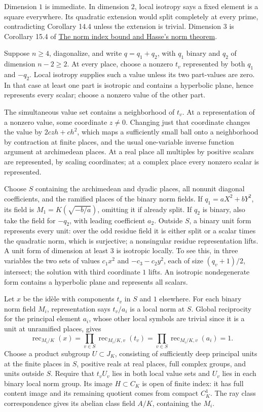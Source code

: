 \documentclass[11pt,a4paper]{article}
\begin{document}
Dimension \(1\) is immediate. In dimension \(2\), local isotropy says a
fixed element is a square everywhere. Its quadratic extension would
split completely at every prime, contradicting Corollary 14.4 unless the
extension is trivial. Dimension \(3\) is Corollary 15.4 of
\href{../the-norm-index-bound-and-hasses-norm-theorem.html}{The norm
index bound and Hasse's norm theorem}.

Suppose \(n\geq4\), diagonalize, and write \(q=q_1+q_2\), with \(q_1\)
binary and \(q_2\) of dimension \(n-2\geq2\). At every place, choose a
nonzero \(t_v\) represented by both \(q_1\) and \(-q_2\). Local isotropy
supplies such a value unless its two part-values are zero. In that case
at least one part is isotropic and contains a hyperbolic plane, hence
represents every scalar; choose a nonzero value of the other part.

The simultaneous value set contains a neighborhood of \(t_v\). At a
representation of a nonzero value, some coordinate \(z\ne0\). Changing
just that coordinate changes the value by \(2czh+ch^2\), which maps a
sufficiently small ball onto a neighborhood by contraction at finite
places, and the usual one-variable inverse function argument at
archimedean places. At a real place all multiples by positive scalars
are represented, by scaling coordinates; at a complex place every
nonzero scalar is represented.

Choose \(S\) containing the archimedean and dyadic places, all nonunit
diagonal coefficients, and the ramified places of the binary norm
fields. If \(q_1=aX^2+bY^2\), its field is \(M_1=K(\sqrt{-b/a})\),
omitting it if already split. If \(q_2\) is binary, also take the field
for \(-q_2\), with leading coefficient \(a_2\). Outside \(S\), a binary
unit form represents every unit: over the odd residue field it is either
split or a scalar times the quadratic norm, which is surjective; a
nonsingular residue representation lifts. A unit form of dimension at
least \(3\) is isotropic locally. To see this, in three variables the
two sets of values \(c_1x^2\) and \(-c_3-c_2y^2\), each of size
\((q_v+1)/2\), intersect; the solution with third coordinate \(1\)
lifts. An isotropic nondegenerate form contains a hyperbolic plane and
represents all scalars.

Let \(x\) be the idèle with components \(t_v\) in \(S\) and \(1\)
elsewhere. For each binary norm field \(M_i\), representation says
\(t_v/a_i\) is a local norm at \(S\). Global reciprocity for the
principal element \(a_i\), whose other local symbols are trivial since
it is a unit at unramified places, gives \[
\operatorname{rec}_{M_i/K}(x)
=\prod_{v\in S}\operatorname{rec}_{M_i/K,v}(t_v)
=\prod_{v\in S}\operatorname{rec}_{M_i/K,v}(a_i)=1.
\tag{34}
\] Choose a product subgroup \(U\subset J_K\), consisting of
sufficiently deep principal units at the finite places in \(S\),
positive reals at real places, full complex groups, and units outside
\(S\). Require that \(t_vU_v\) lies in both local value sets and \(U_v\)
lies in each binary local norm group. Its image \(H\subset C_K\) is open
of finite index: it has full content image and its remaining quotient
comes from compact \(C_K^1\). The ray class correspondence gives its
abelian class field \(A/K\), containing the \(M_i\).
\end{document}
